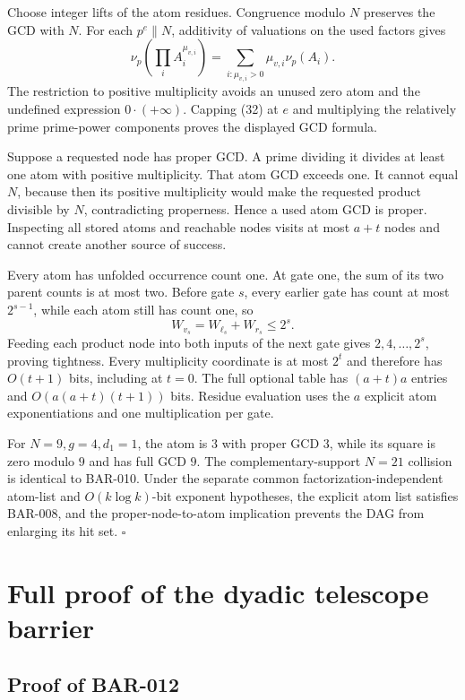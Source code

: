 \documentclass[11pt]{article}
\begin{document}
Choose integer lifts of the atom residues. Congruence modulo \(N\) preserves
the GCD with \(N\). For each \(p^e\parallel N\), additivity of valuations on
the used factors gives
\[
\nu_p\left(\prod_i A_i^{\mu_{v,i}}\right)
=
\sum_{i:\mu_{v,i}>0}\mu_{v,i}\nu_p(A_i).
\tag{32}
\]
The restriction to positive multiplicity avoids an unused zero atom and the
undefined expression \(0\cdot(+\infty)\). Capping (32) at \(e\) and
multiplying the relatively prime prime-power components proves the displayed
GCD formula.

Suppose a requested node has proper GCD. A prime dividing it divides at least
one atom with positive multiplicity. That atom GCD exceeds one. It cannot
equal \(N\), because then its positive multiplicity would make the requested
product divisible by \(N\), contradicting properness. Hence a used atom GCD
is proper. Inspecting all stored atoms and reachable nodes visits at most
\(a+t\) nodes and cannot create another source of success.

Every atom has unfolded occurrence count one. At gate one, the sum of its
two parent counts is at most two. Before gate \(s\), every earlier gate has
count at most \(2^{s-1}\), while each atom still has count one, so
\[
W_{v_s}=W_{\ell_s}+W_{r_s}\le2^s.
\tag{33}
\]
Feeding each product node into both inputs of the next gate gives
\(2,4,\ldots,2^s\), proving tightness. Every multiplicity coordinate is at
most \(2^t\) and therefore has \(O(t+1)\) bits, including at \(t=0\). The
full optional table has \((a+t)a\) entries and
\(O(a(a+t)(t+1))\) bits. Residue evaluation uses the
\(a\) explicit atom exponentiations and one multiplication per gate.

For \(N=9,g=4,d_1=1\), the atom is \(3\) with proper GCD \(3\), while its
square is zero modulo \(9\) and has full GCD \(9\). The complementary-support
\(N=21\) collision is identical to BAR-010. Under the separate common
factorization-independent atom-list and \(O(k\log k)\)-bit exponent
hypotheses, the explicit atom list satisfies BAR-008, and the
proper-node-to-atom implication prevents the DAG from enlarging its hit set.
\(\square\)

\section{Full proof of the dyadic telescope barrier}

\subsection{Proof of BAR-012}\label{proof:BAR-012}
\end{document}
